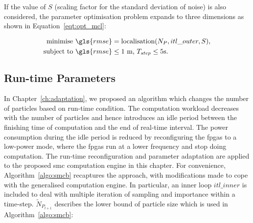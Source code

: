 If the value of $S$ (scaling factor for the standard deviation of noise) is also considered, the parameter optimisation problem expands to three dimensions as shown in Equation~\ref{eqt:opt_mcl}:

\begin{equation}
\begin{aligned}
\mbox{minimise } \gls{rmse} &= \mbox{localisation}(N_P, itl\_outer, S) \mbox{,} \\
\mbox{subject to } \gls{rmse} & \leq \mbox{1 m, } T_{step} \leq \mbox{5s.}
\end{aligned}
\label{eqt:opt_mcl}
\end{equation}


\subsection{Run-time Parameters}

In Chapter~\ref{ch:adaptation}, we proposed an algorithm which changes the number of particles based on run-time condition.
The computation workload decreases with the number of particles and hence introduces an idle period between the finishing time of computation and the end of real-time interval.
The power consumption during the idle period is reduced by reconfiguring the \glspl{fpga} to a low-power mode, where the \glspl{fpga} run at a lower frequency and stop doing computation.
The run-time reconfiguration and parameter adaptation are applied to the proposed \gls{smc} computation engine in this chapter.
For convenience, Algorithm~\ref{algo:smcb} recaptures the approach, with modifications made to cope with the generalised computation engine.
In particular, an inner loop $itl\_inner$ is included to deal with multiple iteration of sampling and importance within a time-step.
$\widetilde{N}_{P_{t+1}}$ describes the lower bound of particle size which is used in Algorithm~\ref{algo:smcb}:

